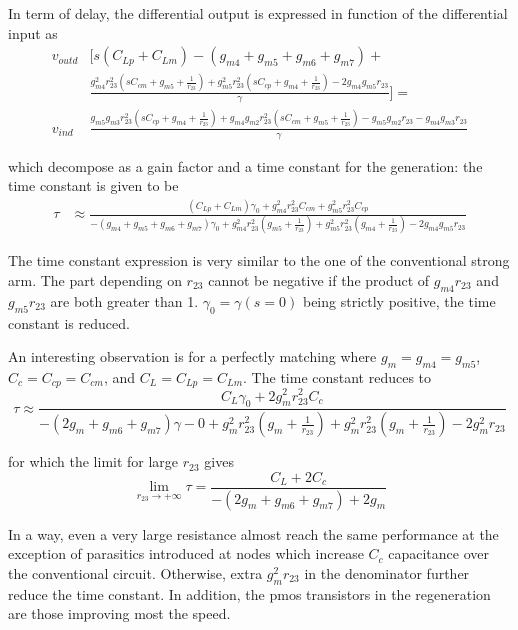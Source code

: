 In term of delay, the differential output is expressed in function of the differential input as
\small
\begin{align}
    v_{outd} & \Biggl[ s \left( C_{Lp}+C_{Lm}\right) -(g_{m4}+g_{m5}+g_{m6}+g_{m7})+ \\
    & \frac{g_{m4}^2 r_{23}^2 \left( sC_{cm}+g_{m5}+\frac{1}{r_{23}} \right) +g_{m5}^2 r_{23}^2 \left( sC_{cp}+g_{m4}+\frac{1}{r_{23}} \right) - 2g_{m4}g_{m5}r_{23}}{\gamma} \Biggr] = \nonumber \\
    v_{ind} & \frac{g_{m5}g_{m3}r_{23}^2 \left( sC_{cp}+g_{m4}+\frac{1}{r_{23}} \right) +g_{m4}g_{m2}r_{23}^2 \left( sC_{cm}+g_{m5}+\frac{1}{r_{23}} \right) -g_{m5}g_{m2}r_{23}-g_{m4}g_{m3}r_{23}}{\gamma} \nonumber
\end{align}
\normalsize

which decompose as a gain factor and a time constant for the generation: the time constant is given to be
\begin{align}
\tau &\approx \frac{\left(C_{Lp}+C_{Lm}\right)\gamma_0+g_{m4}^2r_{23}^2C_{cm}+g_{m5}^2r_{23}^2C_{cp}}{-(g_{m4}+g_{m5}+g_{m6}+g_{m7})\gamma_0+g_{m4}^2 r_{23}^2 \left(g_{m5}+\frac{1}{r_{23}} \right) +g_{m5}^2 r_{23}^2 \left(g_{m4}+\frac{1}{r_{23}} \right) - 2g_{m4}g_{m5}r_{23}}
\end{align}

The time constant expression is very similar to the one of the conventional strong arm. The part depending on \(r_{23}\) cannot be negative if the product of \(g_{m4}r_{23}\) and \(g_{m5}r_{23}\) are both greater than 1. \(\gamma_0 = \gamma(s=0) \) being strictly positive, the time constant is reduced.

An interesting observation is for a perfectly matching where \(g_{m}=g_{m4}=g_{m5}\), \(C_c=C_{cp}=C_{cm}\), and \(C_L=C_{Lp}=C_{Lm}\). The time constant reduces to
\[
    \tau \approx \frac{C_L\gamma_0+2g_{m}^2r_{23}^2C_c}{-(2g_{m}+g_{m6}+g_{m7})\gamma-0+g_{m}^2 r_{23}^2 \left(g_{m}+\frac{1}{r_{23}} \right) +g_{m}^2 r_{23}^2 \left(g_{m}+\frac{1}{r_{23}} \right) - 2g_{m}^2r_{23}}
\] 

for which the limit for large \(r_{23}\) gives
\[
    \lim_{r_{23}\to+\infty} \tau = \frac{C_L+2C_c}{-(2g_{m}+g_{m6}+g_{m7})+2g_{m}}
\]

In a way, even a very large resistance almost reach the same performance at the exception of parasitics introduced at nodes which increase \(C_c\) capacitance over the conventional circuit. Otherwise, extra \(g_{m}^2r_{23}\) in the denominator further reduce the time constant. In addition, the pmos transistors in the regeneration are those improving most the speed.

